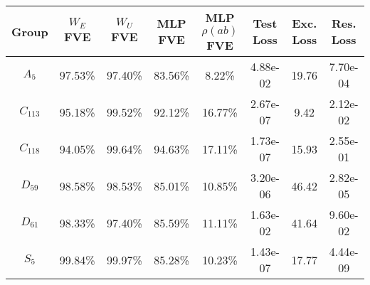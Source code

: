 \begin{tabular}{cccccccc}
\toprule
    Group & $W_E$ FVE & $W_U$ FVE & MLP FVE & MLP $\rho(ab)$ FVE & Test Loss & Exc. Loss & Res. Loss \\
\midrule
  $A_{5}$ &   97.53\% &   97.40\% & 83.56\% &             8.22\% &  4.88e-02 &     19.76 &  7.70e-04 \\
$C_{113}$ &   95.18\% &   99.52\% & 92.12\% &            16.77\% &  2.67e-07 &      9.42 &  2.12e-02 \\
$C_{118}$ &   94.05\% &   99.64\% & 94.63\% &            17.11\% &  1.73e-07 &     15.93 &  2.55e-01 \\
 $D_{59}$ &   98.58\% &   98.53\% & 85.01\% &            10.85\% &  3.20e-06 &     46.42 &  2.82e-05 \\
 $D_{61}$ &   98.33\% &   97.40\% & 85.59\% &            11.11\% &  1.63e-02 &     41.64 &  9.60e-02 \\
  $S_{5}$ &   99.84\% &   99.97\% & 85.28\% &            10.23\% &  1.43e-07 &     17.77 &  4.44e-09 \\
\bottomrule
\end{tabular}
